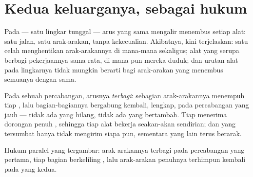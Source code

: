 \section{Kedua keluarganya, sebagai hukum}

\begin{proposition}\label{prop:g7:circuits-series-parallel:series}
Pada  --- satu lingkar tunggal --- arus yang sama
mengalir menembus setiap alat: satu jalan, satu arak-arakan, tanpa
kekecualian. Akibatnya, kini terjelaskan: satu celah menghentikan
arak-arakannya di mana-mana sekaligus; alat yang serupa berbagi
pekerjaannya sama rata, di mana pun mereka duduk; dan urutan alat pada
lingkarnya tidak mungkin berarti bagi arak-arakan yang menembus
semuanya dengan sama.
\end{proposition}

\begin{proposition}\label{prop:g7:circuits-series-parallel:parallel}
Pada sebuah percabangan, arusnya \emph{terbagi}: sebagian
arak-arakannya menempuh tiap , lalu bagian-bagiannya bergabung
kembali, lengkap, pada percabangan yang jauh --- tidak ada yang
hilang, tidak ada yang bertambah. Tiap  menerima dorongan penuh
, sehingga tiap alat bekerja seakan-akan sendirian; dan
 yang tersumbat hanya tidak mengirim siapa pun, sementara 
yang lain terus berarak.
\end{proposition}

\begin{omfigure}

{\small Hukum paralel yang tergambar: arak-arakannya terbagi pada
percabangan yang pertama, tiap bagian berkeliling , lalu
arak-arakan penuhnya terhimpun kembali pada yang kedua.}
\end{omfigure}

